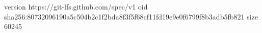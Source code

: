version https://git-lfs.github.com/spec/v1
oid sha256:80732096190a5c504b2c1f2bda8f3f5f68cf11fd19e9e0f6799f8b3adb5fb821
size 60245
